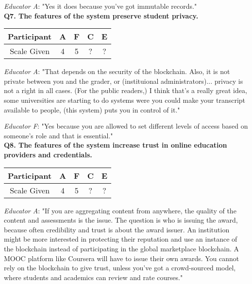 \textit{Educator A}: "Yes it does because you've got immutable records."\\

\textbf{Q7. The features of the system preserve student privacy.}\\
\begin{table}[!ht]
	\centering
	\begin{tabularx}{0.325\textwidth}{|c|c|c|c|c|}
		\hline
		Participant & A                      & F                  & C & E \\
		\hline
		Scale Given & \cellcolor{SpringGreen}4 & \cellcolor{green}5 & ? & ? \\
		\hline
	\end{tabularx}
\end{table}

\textit{Educator A}: "That depends on the security of the blockchain. Also, it is not private between you and
the grader, or (instituional administrators)... privacy is not a right in all cases. (For the public readers,)
I think that's a really great idea, some universities are starting to do systems were you could make your transcript
available to people, (this system) puts you in control of it."

\textit{Educator F}: "Yes because you are allowed to set different levels of access based on someone's role and
that is essential."\\

\textbf{Q8. The features of the system increase trust in online education providers and credentials.}\\
\begin{table}[!ht]
	\centering
	\begin{tabularx}{0.325\textwidth}{|c|c|c|c|c|}
		\hline
		Participant & A                      & F                  & C & E \\
		\hline
		Scale Given & \cellcolor{SpringGreen}4 & \cellcolor{green}5 & ? & ? \\
		\hline
	\end{tabularx}
\end{table}

\textit{Educator A}: "If you are aggregating content from anywhere,
the quality of the content and assessments is the issue. The question is who is issuing the award,
because often credibility and trust is about the award issuer.
An institution might be more interested in protecting their reputation and use an instance of the blockchain
instead of participating in the global marketplace blockchain. A MOOC platform like Coursera will have to issue
their own awards. You cannot rely on the blockchain to give trust, unless you've got a crowd-sourced model,
where students and academics can review and rate courses."


